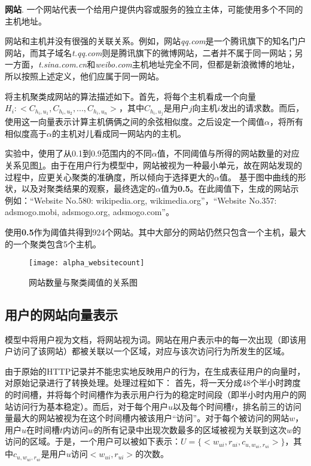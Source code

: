 \begin{definition}
\textbf{网站}. 一个网站代表一个给用户提供内容或服务的独立主体，可能使用多个不同的主机地址。 
\end{definition}

网站和主机并没有很强的关联关系。例如，网站\textit{qq.com}是一个腾讯旗下的知名门户网站，而其子域名\textit{t.qq.com}则是腾讯旗下的微博网站，二者并不属于同一网站；另一方面，\textit{t.sina.com.cn}和\textit{weibo.com}主机地址完全不同，但都是新浪微博的地址，所以按照上述定义，他们应属于同一网站。

将主机聚类成网站的算法描述如下。首先，将每个主机看成一个向量$H_i: <C_{h_i, u_1}, C_{h_i, u_2},...,C_{h_i, u_n}>$，其中$C_{h_i, u_j}$是用户$j$向主机$i$发出的请求数。而后，使用这一向量表示计算主机俩俩之间的余弦相似度。之后设定一个阈值$\alpha$，将所有相似度高于$\alpha$的主机对儿看成同一网站内的主机。

实验中，使用了从0.1到0.9范围内的不同$\alpha$值，不同阈值与所得的网站数量的对应关系见图\ref{interest:fig:websitecount}。由于在用户行为模型中，网站被视为一种最小单元，故在网站发现的过程中，应更关心聚类的准确度，所以倾向于选择更大的$\alpha$值。 基于图中曲线的形状，以及对聚类结果的观察，最终选定的$\alpha$值为\textbf{0.5}。在此阈值下，生成的网站示例如：``Website No.580: wikipedia.org, wikimedia.org''，``Website No.357: adsmogo.mobi, adsmogo.org, adsmogo.com''。

使用\textbf{0.5}作为阈值共得到924个网站。其中大部分的网站仍然只包含一个主机，最大的一个聚类包含5个主机。

\begin{figure}
\centering
\texttt{[image: alpha\_websitecount]}
\caption{网站数量与聚类阈值的关系图}
\label{interest:fig:websitecount}
\end{figure}

\subsection{用户的网站向量表示} 

模型中将用户视为文档，将网站视为词。网站在用户表示中的每一次出现（即该用户访问了该网站）都被关联以一个区域，对应与该次访问行为所发生的区域。

由于原始的HTTP记录并不能忠实地反映用户的行为，在生成表征用户的向量时，对原始记录进行了转换处理。处理过程如下：
首先，将一天分成48个半小时跨度的时间槽，并将每个时间槽作为表示用户行为的稳定时间段（即半小时内用户的网站访问行为基本稳定）\cite{tist11farrahi}。而后，对于每个用户$u$以及每个时间槽$t$，排名前三的访问量最大的网站被视为在这个时间槽内被该用户``访问''。对于每个被访问的网站$w$，用户$u$在时间槽$t$内访问$w$的所有记录中出现次数最多的区域被视为关联到这次$w$的访问的区域。于是，一个用户可以被如下表示：$U = \{{<w_{ui}, r_{ui}, c_{u,w_{ui},r_{ui}}>}\}$，其中$c_{u,w_{ui},r_{ui}}$是用户$u$访问$<w_{ui}, r_{ui}>$的次数。


